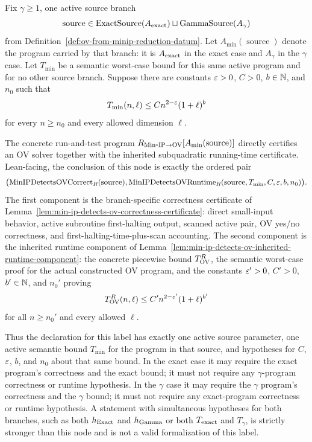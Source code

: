 \begin{lemma}
  \label{lem:min-ip-detects-ov}
  Fix $\gamma\geq1$, one active source branch
  \[
    \operatorname{source}\in
      \operatorname{ExactSource}(A_{\rm exact})
      \sqcup
      \operatorname{GammaSource}(A_{\gamma})
  \]
  from Definition~\ref{def:ov-from-minip-reduction-datum}.  Let
  $A_{\min}(\operatorname{source})$ denote the program carried by that branch:
  it is $A_{\rm exact}$ in the exact case and $A_{\gamma}$ in the $\gamma$
  case.  Let $T_{\min}$ be a semantic worst-case bound for this same active
  program and for no other source branch.  Suppose
  there are constants $\varepsilon>0$, $C>0$, $b\in\mathbb{N}$, and $n_0$ such that
  \[
    T_{\min}(n,\ell)\leq C n^{2-\varepsilon}(1+\ell)^b
  \]
  for every $n\geq n_0$ and every allowed dimension $\ell$.

  The concrete run-and-test program
  $R_{\mathrm{Min\mbox{-}IP}\to\mathrm{OV}}[A_{\min}(\operatorname{source})]$ directly certifies an
  OV solver together with
  the inherited subquadratic running-time certificate.  Lean-facing, the
  conclusion of this node is exactly the ordered pair
  \[
    \bigl(
      \operatorname{MinIPDetectsOVCorrect}_R(\operatorname{source}),
      \operatorname{MinIPDetectsOVRuntime}_R
        (\operatorname{source},T_{\min},C,\varepsilon,b,n_0)
    \bigr).
  \]
  The first component is the branch-specific correctness certificate of
  Lemma~\ref{lem:min-ip-detects-ov-correctness-certificate}: direct
  small-input behavior, active subroutine first-halting output, scanned active
  pair, OV yes/no correctness, and first-halting-time-plus-scan accounting.
  The second component is the inherited runtime component of
  Lemma~\ref{lem:min-ip-detects-ov-inherited-runtime-component}: the concrete
  piecewise bound $T_{\mathrm{OV}}^R$, the semantic worst-case proof for the actual
  constructed OV program, and the constants
  $\varepsilon'>0$, $C'>0$, $b'\in\mathbb{N}$, and $n_0'$ proving
  \[
    T_{\mathrm{OV}}^R(n,\ell)\leq C'n^{2-\varepsilon'}(1+\ell)^{b'}
  \]
  for all $n\geq n_0'$ and every allowed $\ell$.

  Thus the declaration for this label has exactly one active source parameter,
  one active semantic bound $T_{\min}$ for the program in that source, and
  hypotheses for $C$, $\varepsilon$, $b$, and $n_0$ about that same bound.  In the
  exact case it may require the exact program's correctness and the exact
  bound; it must not require any $\gamma$-program correctness or runtime
  hypothesis.  In the $\gamma$ case it may require the $\gamma$ program's
  correctness and the $\gamma$ bound; it must not require any exact-program
  correctness or runtime hypothesis.  A statement with simultaneous
  hypotheses for both branches, such as both $h_{\rm Exact}$ and
  $h_{\rm Gamma}$ or both $T_{\rm exact}$ and $T_{\gamma}$, is strictly
  stronger than this node and is not a valid formalization of this label.
\end{lemma}
